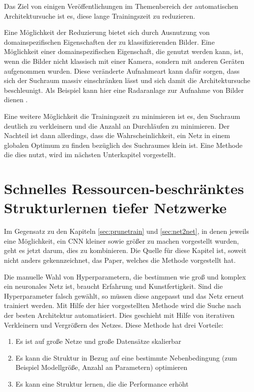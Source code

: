 Das Ziel von einigen Veröffentlichungen im Themenbereich der automatischen Architektursuche ist es, diese lange Trainingszeit zu reduzieren.

Eine Möglichkeit der Reduzierung bietet sich durch Ausnutzung von domainspezifischen Eigenschaften der zu klassifizierenden Bilder. Eine Möglichkeit einer domainspezifischen Eigenschaft, die genutzt werden kann, ist, wenn die Bilder nicht klassisch mit einer Kamera, sondern mit anderen Geräten aufgenommen wurden. Diese veränderte Aufnahmeart kann dafür sorgen, dass sich der Suchraum massiv einschränken lässt und sich damit die Architektursuche beschleunigt.
Als Beispiel kann hier eine Radaranlage zur Aufnahme von Bilder dienen \cite{polsar}.


Eine weitere Möglichkeit die Trainingszeit zu minimieren ist es, den Suchraum deutlich zu verkleinern und die Anzahl an Durchläufen zu minimieren. Der Nachteil ist dann allerdings, dass die Wahrscheinlichkeit, ein Netz in einem globalen Optimum zu finden bezüglich des Suchraumes klein ist. Eine Methode die dies nutzt, wird im nächsten Unterkapitel vorgestellt.

\section{Schnelles Ressourcen-beschränktes Strukturlernen tiefer Netzwerke}\label{sec:morphnet}
Im Gegensatz zu den Kapiteln \ref{sec:prunetrain} und \ref{sec:net2net}, in denen jeweils eine Möglichkeit, ein CNN kleiner sowie größer zu machen vorgestellt wurden, geht es jetzt darum, dies zu kombinieren. Die Quelle für diese Kapitel ist, soweit nicht anders gekennzeichnet, das Paper, welches die Methode vorgestellt hat.

Die manuelle Wahl von Hyperparametern, die bestimmen wie groß und komplex ein neuronales Netz ist, 
braucht Erfahrung und Kunstfertigkeit. Sind die Hyperparameter falsch gewählt, so müssen diese angepasst und das Netz erneut trainiert werden. Mit Hilfe der hier vorgestellten Methode wird die Suche nach der besten Architektur automatisiert. Dies geschieht mit Hilfe von iterativen Verkleinern und Vergrößern des Netzes. Diese Methode hat drei Vorteile:
\begin{enumerate}
 \item Es ist auf große Netze und große Datensätze skalierbar
 \item Es kann die Struktur in Bezug auf eine bestimmte Nebenbedingung (zum Beispiel Modellgröße, Anzahl an Parametern) optimieren
 \item Es kann eine Struktur lernen, die die Performance erhöht
\end{enumerate}

